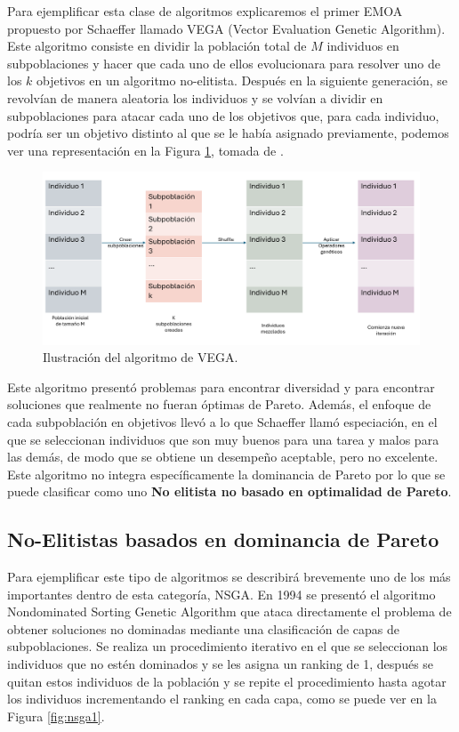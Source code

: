 Para ejemplificar esta clase de algoritmos explicaremos el primer EMOA propuesto por Schaeffer \cite{schafferMultipleObjectiveOptimization1984} llamado VEGA (Vector Evaluation Genetic Algorithm). Este algoritmo consiste en dividir la población total de $M$ individuos en subpoblaciones y hacer que cada uno de ellos evolucionara para resolver uno de los $k$ objetivos en un algoritmo no-elitista. Después en la siguiente generación, se revolvían de manera aleatoria los individuos y se volvían a dividir en subpoblaciones para atacar cada uno de los objetivos que, para cada individuo, podría ser un objetivo distinto al que se le había asignado previamente, podemos ver una representación en la Figura \ref{fig:VEGA}, tomada de \cite{coelloEvolutionaryAlgorithmsSolving}.

\begin{figure}[H]
    \centering
    \includegraphics[width=\textwidth]{Figuras/VEGA_diagrama.png}
    \caption[VEGA]{Ilustración del algoritmo de VEGA.}
    \label{fig:VEGA}
\end{figure}

Este algoritmo presentó problemas para encontrar diversidad y para encontrar soluciones que realmente no fueran óptimas de Pareto. Además, el enfoque de cada subpoblación en objetivos llevó a lo que Schaeffer llamó especiación, en el que se seleccionan individuos que son muy buenos para una tarea y malos para las demás, de modo que se obtiene un desempeño aceptable, pero no excelente. Este algoritmo no integra específicamente la dominancia de Pareto por lo que se puede clasificar como uno \textbf{No elitista no basado en optimalidad de Pareto}.

\subsection*{No-Elitistas basados en dominancia de Pareto}

Para ejemplificar este tipo de algoritmos se describirá brevemente uno de los más importantes dentro de esta categoría, NSGA. En 1994 se presentó el algoritmo Nondominated Sorting Genetic Algorithm \cite{srinivasMuiltiobjectiveOptimizationUsing1994} que ataca directamente el problema de obtener soluciones no dominadas mediante una clasificación de capas de subpoblaciones. Se realiza un procedimiento iterativo en el que se seleccionan los individuos que no estén dominados y se les asigna un ranking de 1, después se quitan estos individuos de la población y se repite el procedimiento hasta agotar los individuos incrementando el ranking en cada capa, como se puede ver en la Figura \ref{fig:nsga1}.

